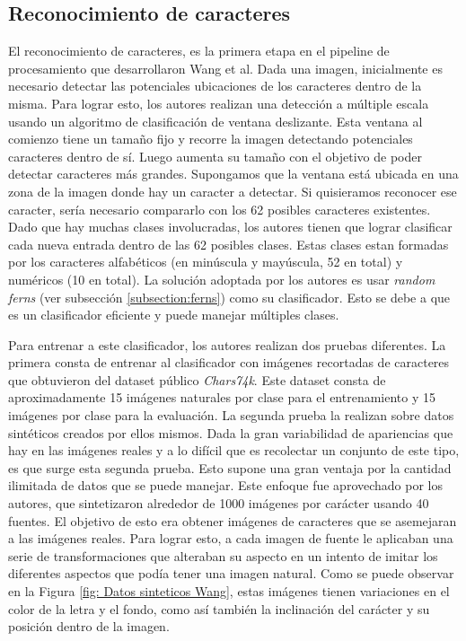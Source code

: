 \subsection{Reconocimiento de caracteres}
\label{subsection: wang_recon_caracteres}
	
	El reconocimiento de caracteres, es la primera etapa en el pipeline de procesamiento que desarrollaron Wang et al. Dada una imagen, inicialmente es necesario detectar las potenciales ubicaciones de los caracteres dentro de la misma. Para lograr esto, los autores realizan una detección a múltiple escala usando un algoritmo de clasificación de ventana deslizante. Esta ventana al comienzo tiene un tamaño fijo y  recorre la imagen detectando potenciales caracteres dentro de sí. Luego aumenta su tamaño con el objetivo de poder detectar caracteres más grandes. Supongamos que la ventana está ubicada en una zona de la imagen donde hay un caracter a detectar. Si quisieramos reconocer ese caracter, sería necesario compararlo con los 62 posibles caracteres existentes. Dado que hay muchas clases involucradas, los autores tienen que lograr clasificar cada nueva entrada dentro de las 62 posibles clases. Estas clases estan formadas por los caracteres alfabéticos (en minúscula y mayúscula, 52 en total) y numéricos (10 en total). La solución adoptada por los autores es usar \textit{random ferns} (ver subsección \ref{subsection:ferns}) como su clasificador. Esto se debe a que es un clasificador eficiente y puede manejar múltiples clases.
	
	Para entrenar a este clasificador, los autores realizan dos pruebas diferentes. La primera consta de entrenar al clasificador con imágenes recortadas de caracteres que obtuvieron del dataset público \textit{Chars74k}. Este dataset consta de aproximadamente 15 imágenes naturales por clase para el entrenamiento y 15 imágenes por clase para la evaluación. La segunda prueba la realizan sobre datos sintéticos creados por ellos mismos. Dada la gran variabilidad de apariencias que hay en las imágenes reales y a lo difícil que es recolectar un conjunto de este tipo, es que surge esta segunda prueba. Esto supone una gran ventaja por la cantidad ilimitada de datos que se puede manejar. Este enfoque fue aprovechado por los autores, que sintetizaron alrededor de 1000 imágenes por carácter usando 40 fuentes. El objetivo de esto era obtener imágenes de caracteres que se asemejaran a las imágenes reales. Para lograr esto, a cada imagen de fuente le aplicaban una serie de transformaciones que alteraban su aspecto en un intento de imitar los diferentes aspectos que podía tener una imagen natural. Como se puede observar en la Figura \ref{fig: Datos sinteticos Wang}, estas imágenes tienen variaciones en el color de la letra y el fondo, como así también la inclinación del carácter y su posición dentro de la imagen.
	
